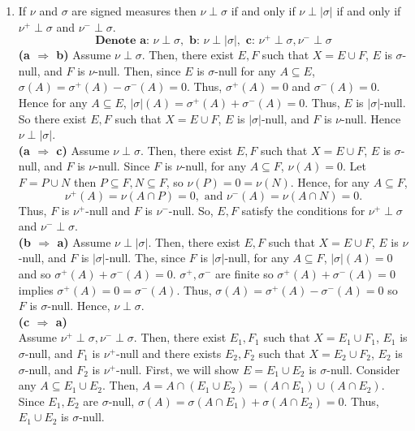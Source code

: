 \begin{enumerate}
\item If $\nu$ and $\sigma$ are signed measures then $\nu \perp \sigma$ if and only if $\nu \perp |\sigma|$ if and only if $\nu^+ \perp \sigma$ and $\nu^- \perp \sigma$.
\\
\[
\textbf{Denote a: } \nu \perp \sigma, \textbf{   b: } \nu \perp |\sigma|, \textbf{   c: } \nu^+ \perp \sigma, \nu^- \perp \sigma
\]
\textbf{(a $\Rightarrow$ b) } Assume $\nu \perp \sigma$. Then, there exist $E, F$ such that $X = E \cup F$, $E$ is $\sigma$-null, and $F$ is $\nu$-null. Then, since $E$ is $\sigma$-null for any $A \subseteq E$, $\sigma(A) = \sigma^+(A) - \sigma^-(A)=0$. Thus, $\sigma^+(A)=0$ and $\sigma^-(A)=0$. Hence for any $A \subseteq E$, $|\sigma|(A) = \sigma^+(A)+\sigma^-(A) = 0$. Thus, $E$ is $|\sigma|$-null. So there exist $E, F$ such that $X = E \cup F$, $E$ is $|\sigma|$-null, and $F$ is $\nu$-null. Hence $\nu \perp |\sigma|$.
\\
\textbf{ (a $\Rightarrow$ c) } 
Assume $\nu \perp \sigma$. Then, there exist $E, F$ such that $X = E \cup F$, $E$ is $\sigma$-null, and $F$ is $\nu$-null. Since $F$ is $\nu$-null, for any $A \subseteq F$, $\nu(A)=0$. Let $F= P \cup N$ then $P \subseteq F, N \subseteq F$, so $\nu(P)=0=\nu(N)$. Hence, for any $A \subseteq F$,
\[
\nu^+(A) = \nu(A \cap P) = 0, \text{ and } \nu^-(A) = \nu(A \cap N) = 0.
\]
Thus, $F$ is $\nu^+$-null and $F$ is $\nu^-$-null. So, $E, F$ satisfy the conditions for $\nu^+ \perp \sigma$ and $\nu^- \perp \sigma$.
\\
\textbf{(b $\Rightarrow$ a) } Assume $\nu \perp |\sigma|$. Then, there exist $E, F$ such that $X = E \cup F$, $E$ is $\nu$-null, and $F$ is $|\sigma|$-null. The, since $F$ is $|\sigma|$-null, for any $A \subseteq F$, $|\sigma|(A)=0$ and so $\sigma^+(A) + \sigma^-(A)=0$. $\sigma^+, \sigma^-$ are finite so $\sigma^+(A) + \sigma^-(A)=0$ implies $\sigma^+(A)=0=\sigma^-(A)$. Thus, $\sigma(A) = \sigma^+(A) - \sigma^-(A) = 0 $ so $F$ is $\sigma$-null. Hence, $\nu \perp \sigma$.
\\
\textbf{(c $\Rightarrow$ a) } \\
Assume $\nu^+ \perp \sigma, \nu^- \perp \sigma$. Then, there exist $E_1, F_1$ such that $X = E_1 \cup F_1$, $E_1$ is $\sigma$-null, and $F_1$ is $\nu^+$-null and there exists $E_2, F_2$ such that $X = E_2 \cup F_2$, $E_2$ is $\sigma$-null, and $F_2$ is $\nu^+$-null. First, we will show $E = E_1 \cup E_2 $ is $\sigma$-null. Consider any $A \subseteq E_1 \cup E_2$. Then, $A = A \cap (E_1 \cup E_2)= (A \cap E_1) \cup (A \cap E_2)$. Since $E_1, E_2$ are $\sigma$-null, $\sigma(A)= \sigma(A \cap E_1) + \sigma (A \cap E_2)=0$. Thus, $E_1 \cup E_2$ is $\sigma$-null.

\end{enumerate}
